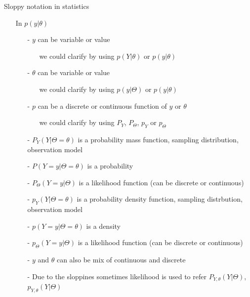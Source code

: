 \documentclass[english,t]{beamer}
\begin{document}
\begin{frame}{Sloppy notation in statistics}
  
  \begin{itemize}
  \item[] In $p(y|\theta)$
    \pause
  \begin{itemize}
  \item[-] $y$ can be variable or value
    \begin{itemize}
    \item[] we could clarify by using $p(Y|\theta)$ or $p(y|\theta)$
    \end{itemize}
    \pause
  \item[-] $\theta$ can be variable or value
    \begin{itemize}
    \item[] we could clarify by using $p(y|\Theta)$ or $p(y|\theta)$
    \end{itemize}
    \pause
  \item[-] $p$ can be a discrete or continuous function of $y$ or $\theta$
    \begin{itemize}
    \item[] we could clarify by using $P_Y$, $P_\Theta$, $p_Y$ or $p_\Theta$
    \end{itemize}
    \pause
\item[-]
  $P_Y(Y|\Theta=\theta)$ is a probability mass function, sampling distribution, observation model
    \pause
\item[-]
$P(Y=y|\Theta=\theta)$ is a probability
    \pause
\item[-]
$P_\Theta(Y=y|\Theta)$ is a likelihood function (can be discrete or continuous)
    \pause
\item[-] $p_Y(Y|\Theta=\theta)$ is a probability density function, sampling distrbution, observation model
    \pause
\item[-] $p(Y=y|\Theta=\theta)$ is a density
    \pause
\item[-] $p_\Theta(Y=y|\Theta)$ is a likelihood function (can be discrete or continuous)
    \pause
  \item[-] $y$ and $\theta$ can also be mix of continuous and discrete
    \pause
    \item[-] Due to the sloppines sometimes likelihood is used to refer
$P_{Y,\theta}(Y|\Theta)$, $p_{Y,\theta}(Y|\Theta)$

  \end{itemize}
\end{itemize}
\end{frame}
\end{document}
